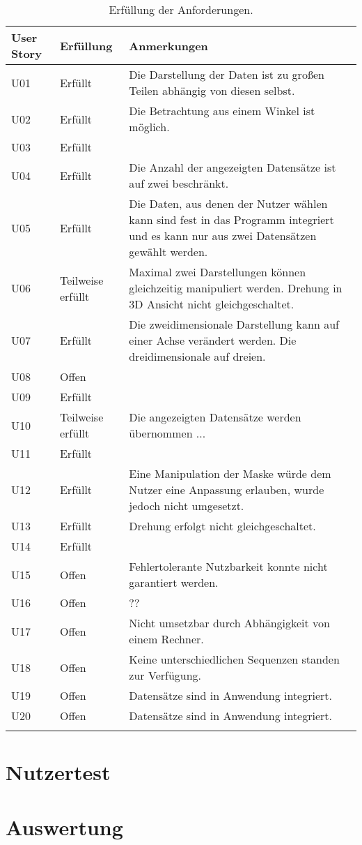 \begin{longtable} {p{}p{}p{}}
\toprule
User Story & Erfüllung & Anmerkungen \\
\toprule
U01 & Erfüllt & Die Darstellung der Daten ist zu großen Teilen abhängig von diesen selbst.\\
\midrule 
U02 & Erfüllt & Die Betrachtung aus einem Winkel ist möglich.\\
\midrule 
U03 & Erfüllt & \\
\midrule 
U04 & Erfüllt & Die Anzahl der angezeigten Datensätze ist auf zwei beschränkt.\\
\midrule 
U05 & Erfüllt & Die Daten, aus denen der Nutzer wählen kann sind fest in das Programm integriert und es kann nur aus zwei Datensätzen gewählt werden.\\
\midrule
U06 & Teilweise erfüllt & Maximal zwei Darstellungen können gleichzeitig manipuliert werden. Drehung in 3D Ansicht nicht gleichgeschaltet.\\
\midrule 
U07 & Erfüllt & Die zweidimensionale Darstellung kann auf einer Achse verändert werden. Die dreidimensionale auf dreien.\\
\midrule 
U08 & Offen & \\
\midrule 
U09 & Erfüllt & \\
\midrule 
U10 & Teilweise erfüllt & Die angezeigten Datensätze werden übernommen ...\\
\midrule 
U11  & Erfüllt & \\
\midrule
U12 & Erfüllt & Eine Manipulation der Maske würde dem Nutzer eine Anpassung erlauben, wurde jedoch nicht umgesetzt.\\
\midrule 
U13 & Erfüllt & Drehung erfolgt nicht gleichgeschaltet.\\
\midrule 
U14 & Erfüllt & \\
\midrule 
U15 & Offen & Fehlertolerante Nutzbarkeit konnte nicht garantiert werden.\\
\midrule 
U16 & Offen & ??\\
\midrule 
U17 & Offen & Nicht umsetzbar durch Abhängigkeit von einem Rechner.\\
\midrule 
U18 & Offen & Keine unterschiedlichen Sequenzen standen zur Verfügung.\\
\midrule 
U19 & Offen & Datensätze sind in Anwendung integriert.\\
\midrule 
U20 & Offen & Datensätze sind in Anwendung integriert.\\

\bottomrule
\caption{\label{tab:evaluation}Erfüllung der Anforderungen.}
\end{longtable}


\section{Nutzertest}

\section{Auswertung}
